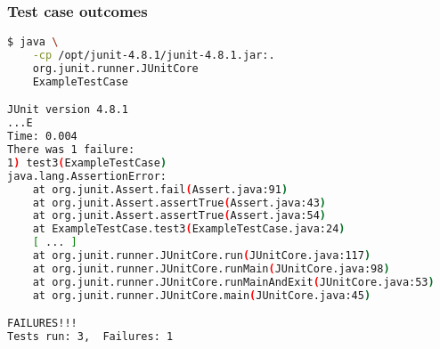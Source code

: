 \begin{frame}[fragile, hasnext=false, hasprev=false]
\frametitle{Test case outcomes}
\label{example:junit-testcase-outcomes}

\begin{lstlisting}[language=bash]
$ java \
	-cp /opt/junit-4.8.1/junit-4.8.1.jar:.
	org.junit.runner.JUnitCore
	ExampleTestCase

JUnit version 4.8.1
...E
Time: 0.004
There was 1 failure:
1) test3(ExampleTestCase)
java.lang.AssertionError:
	at org.junit.Assert.fail(Assert.java:91)
	at org.junit.Assert.assertTrue(Assert.java:43)
	at org.junit.Assert.assertTrue(Assert.java:54)
	at ExampleTestCase.test3(ExampleTestCase.java:24)
	[ ... ]
	at org.junit.runner.JUnitCore.run(JUnitCore.java:117)
	at org.junit.runner.JUnitCore.runMain(JUnitCore.java:98)
	at org.junit.runner.JUnitCore.runMainAndExit(JUnitCore.java:53)
	at org.junit.runner.JUnitCore.main(JUnitCore.java:45)

FAILURES!!!
Tests run: 3,  Failures: 1
\end{lstlisting}
\end{frame}